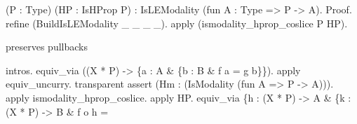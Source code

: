 \begin{coqdoccode}
\begin{coqdoccomment}
\coqdoceol
\coqdocindent{4.00em}
(P\coqdocindent{0.50em}
:\coqdocindent{0.50em}
Type)\coqdocindent{0.50em}
(HP\coqdocindent{0.50em}
:\coqdocindent{0.50em}
IsHProp\coqdocindent{0.50em}
P)\coqdoceol
\coqdocindent{1.00em}
:\coqdocindent{0.50em}
IsLEModality\coqdocindent{0.50em}
(fun\coqdocindent{0.50em}
A\coqdocindent{0.50em}
:\coqdocindent{0.50em}
Type\coqdocindent{0.50em}
=>\coqdocindent{0.50em}
P\coqdocindent{0.50em}
->\coqdocindent{0.50em}
A).\coqdoceol
Proof.\coqdoceol
\coqdocindent{1.00em}
refine\coqdocindent{0.50em}
(BuildIsLEModality\coqdocindent{0.50em}
\_\coqdocindent{0.50em}
\_\coqdocindent{0.50em}
\_\coqdocindent{0.50em}
\_).\coqdocindent{0.50em}
\coqdoceol
\coqdocindent{1.00em}
apply\coqdocindent{0.50em}
(ismodality\_hprop\_coslice\coqdocindent{0.50em}
P\coqdocindent{0.50em}
HP).\coqdoceol
\coqdoceol
\coqdocindent{1.00em}
\begin{coqdoccomment}
\coqdocindent{0.50em}
preserves\coqdocindent{0.50em}
pullbacks\coqdocindent{0.50em}
\end{coqdoccomment}
\coqdoceol
\coqdocindent{1.00em}
intros.\coqdoceol
\coqdocindent{1.00em}
equiv\_via\coqdocindent{0.50em}
((X\coqdocindent{0.50em}
*\coqdocindent{0.50em}
P)\coqdocindent{0.50em}
->\coqdocindent{0.50em}
\{a\coqdocindent{0.50em}
:\coqdocindent{0.50em}
A\coqdocindent{0.50em}
\&\coqdocindent{0.50em}
\{b\coqdocindent{0.50em}
:\coqdocindent{0.50em}
B\coqdocindent{0.50em}
\&\coqdocindent{0.50em}
f\coqdocindent{0.50em}
a\coqdocindent{0.50em}
=\coqdocindent{0.50em}
g\coqdocindent{0.50em}
b\}\}).\coqdoceol
\coqdocindent{1.00em}
apply\coqdocindent{0.50em}
equiv\_uncurry.\coqdoceol
\coqdocindent{1.00em}
transparent\coqdocindent{0.50em}
assert\coqdocindent{0.50em}
(Hm\coqdocindent{0.50em}
:\coqdocindent{0.50em}
(IsModality\coqdocindent{0.50em}
(fun\coqdocindent{0.50em}
A\coqdocindent{0.50em}
=>\coqdocindent{0.50em}
P\coqdocindent{0.50em}
->\coqdocindent{0.50em}
A))).\coqdoceol
\coqdocindent{2.00em}
apply\coqdocindent{0.50em}
ismodality\_hprop\_coslice.\coqdocindent{0.50em}
apply\coqdocindent{0.50em}
HP.\coqdoceol
\coqdocindent{1.00em}
equiv\_via\coqdocindent{0.50em}
\{h\coqdocindent{0.50em}
:\coqdocindent{0.50em}
(X\coqdocindent{0.50em}
*\coqdocindent{0.50em}
P)\coqdocindent{0.50em}
->\coqdocindent{0.50em}
A\coqdocindent{0.50em}
\&\coqdoceol
\coqdocindent{1.50em}
\{k\coqdocindent{0.50em}
:\coqdocindent{0.50em}
(X\coqdocindent{0.50em}
*\coqdocindent{0.50em}
P)\coqdocindent{0.50em}
->\coqdocindent{0.50em}
B\coqdocindent{0.50em}
\&\coqdoceol
\coqdocindent{1.50em}
f\coqdocindent{0.50em}
o\coqdocindent{0.50em}
h\coqdocindent{0.50em}
=\coqdocindent{0.50em}

\end{coqdoccomment}
\end{coqdoccode}
